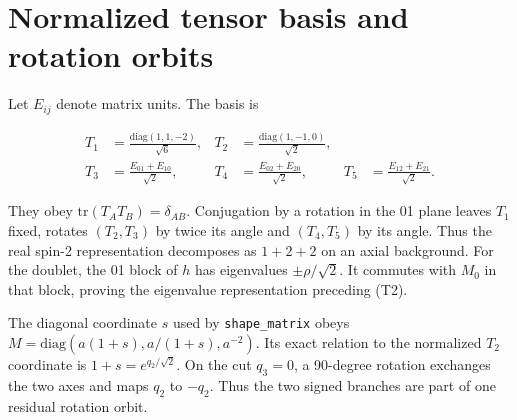 \section{Normalized tensor basis and rotation orbits}

\label{app:C}

Let $E_{ij}$ denote matrix units. The basis is

\begin{equation}\tag{C1}\label{eq:C1}
\begin{aligned}
T_1&=\frac{\mathrm{diag}(1,1,-2)}{\sqrt6},&
T_2&=\frac{\mathrm{diag}(1,-1,0)}{\sqrt2},\\
T_3&=\frac{E_{01}+E_{10}}{\sqrt2},&
T_4&=\frac{E_{02}+E_{20}}{\sqrt2},&
T_5&=\frac{E_{12}+E_{21}}{\sqrt2}.
\end{aligned}
\end{equation}

They obey $\mathrm{tr}(T_AT_B)=\delta_{AB}$. Conjugation by a rotation in the 01 plane leaves $T_1$ fixed, rotates $(T_2,T_3)$ by twice its angle and $(T_4,T_5)$ by its angle. Thus the real spin-2 representation decomposes as $1+2+2$ on an axial background. For the doublet, the 01 block of $h$ has eigenvalues $\pm\rho/\sqrt2$. It commutes with $M_0$ in that block, proving the eigenvalue representation preceding (T2).

The diagonal coordinate $s$ used by \texttt{shape\_matrix} obeys $M=\mathrm{diag}(a(1+s),a/(1+s),a^{-2})$. Its exact relation to the normalized $T_2$ coordinate is $1+s=e^{q_2/\sqrt2}$. On the cut $q_3=0$, a 90-degree rotation exchanges the two axes and maps $q_2$ to $-q_2$. Thus the two signed branches are part of one residual rotation orbit.
